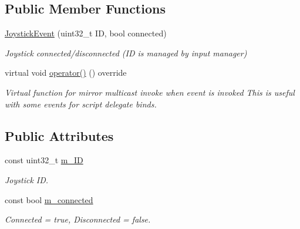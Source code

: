 \subsection*{Public Member Functions}
\begin{DoxyCompactItemize}
\item 
\hyperlink{classJoystickEvent_a9d24f7de04b58c919b406c75d83a6e8f}{Joystick\+Event} (uint32\+\_\+t ID, bool connected)
\begin{DoxyCompactList}\small\item\em Joystick connected/disconnected (ID is managed by input manager) \end{DoxyCompactList}\item 
\mbox{\label{classJoystickEvent_a4ac93c8d959777d6709bd778c623e022}} 
virtual void \hyperlink{classJoystickEvent_a4ac93c8d959777d6709bd778c623e022}{operator()} () override
\begin{DoxyCompactList}\small\item\em Virtual function for mirror multicast invoke when event is invoked This is useful with some events for script delegate binds. \end{DoxyCompactList}\end{DoxyCompactItemize}
\subsection*{Public Attributes}
\begin{DoxyCompactItemize}
\item 
\mbox{\label{classJoystickEvent_a222d90e5a0a1e449da161732508fe0a1}} 
const uint32\+\_\+t \hyperlink{classJoystickEvent_a222d90e5a0a1e449da161732508fe0a1}{m\+\_\+\+ID}
\begin{DoxyCompactList}\small\item\em Joystick ID. \end{DoxyCompactList}\item 
\mbox{\label{classJoystickEvent_afa3769e71c4b196e19ddcfb182e89fae}} 
const bool \hyperlink{classJoystickEvent_afa3769e71c4b196e19ddcfb182e89fae}{m\+\_\+connected}
\begin{DoxyCompactList}\small\item\em Connected = true, Disconnected = false. \end{DoxyCompactList}\end{DoxyCompactItemize}
